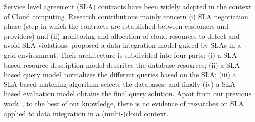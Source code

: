 Service level agreement (SLA) contracts have been widely adopted in the context of Cloud computing. Research contributions mainly concern (i) SLA negotiation phase (step in which the contracts are established between customers and providers) and (ii) monitoring and allocation of cloud resources to detect and avoid SLA violations.
\cite{Nie07} proposed a data integration model guided by SLAs in a grid environment. Their architecture is subdivided into four parts: (i) a SLA-based resource description model describes the database resources; (ii) a SLA-based query model normalizes the different queries based on the SLA; (iii) a SLA-based matching algorithm selects the databases; and finally (iv) a SLA-based evaluation model obtains the final query solution.
Apart from our previous work~\cite{Bennani2014}, to the best of our knowledge, there is no evidence of researches on SLA applied to data integration in a (multi-)cloud context.
